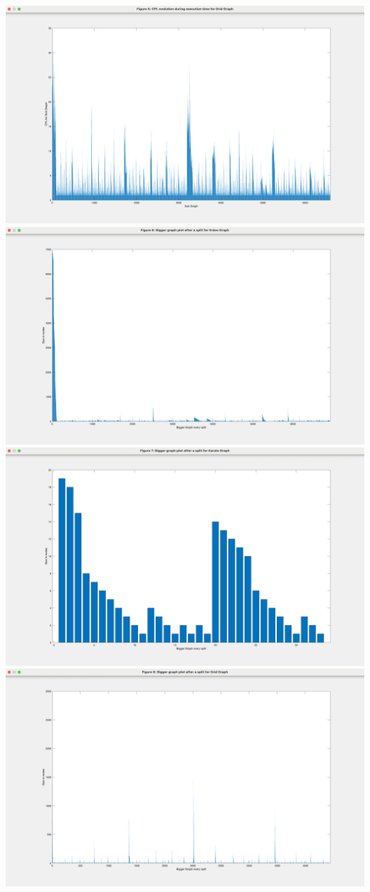 \documentclass{article}
\begin{document}
\includegraphics[width=\textwidth]{Figure5.png}\bigbreak
\includegraphics[width=\textwidth]{Figure6.png}\bigbreak
\includegraphics[width=\textwidth]{Figure7.png}\bigbreak
\includegraphics[width=\textwidth]{Figure8.png}\bigbreak
\end{document}
